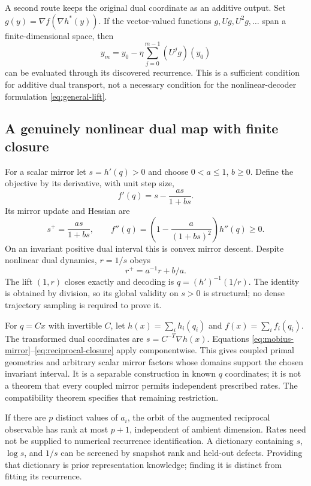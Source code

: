 A second route keeps the original dual coordinate as an additive output.
Set $g(y)=\nabla f(\nabla h^*(y))$. If the vector-valued functions
$g,Ug,U^2g,\ldots$ span a finite-dimensional space, then
\begin{equation}
 y_m=y_0-\eta\sum_{j=0}^{m-1}(U^jg)(y_0)
 \label{eq:gradient-module}
\end{equation}
can be evaluated through its discovered recurrence. This is a sufficient
condition for additive dual transport, not a necessary condition for the
nonlinear-decoder formulation \eqref{eq:general-lift}.

\subsection{A genuinely nonlinear dual map with finite closure}
For a scalar mirror let $s=h'(q)>0$ and choose $0<a\leq1$, $b\geq0$.
Define the objective by its derivative, with unit step size,
\begin{equation}
 f'(q)=s-\frac{as}{1+bs}.
\end{equation}
Its mirror update and Hessian are
\begin{equation}
 s^+=\frac{as}{1+bs},\qquad
 f''(q)=\left(1-\frac{a}{(1+bs)^2}\right)h''(q)\geq0.
 \label{eq:mobius-mirror}
\end{equation}
On an invariant positive dual interval this is convex mirror descent.
Despite nonlinear dual dynamics, $r=1/s$ obeys
\begin{equation}
 r^+=a^{-1}r+b/a.
 \label{eq:reciprocal-closure}
\end{equation}
The lift $(1,r)$ closes exactly and decoding is $q=(h')^{-1}(1/r)$.
The identity is obtained by division, so its global validity on $s>0$ is
structural; no dense trajectory sampling is required to prove it.

For $q=Cx$ with invertible $C$, let
$h(x)=\sum_i h_i(q_i)$ and $f(x)=\sum_i f_i(q_i)$.
The transformed dual coordinates are $s=C^{-T}\nabla h(x)$.
Equations \eqref{eq:mobius-mirror}--\eqref{eq:reciprocal-closure} apply componentwise.
This gives coupled primal geometries and arbitrary scalar mirror factors
whose domains support the chosen invariant interval. It is a separable
construction in known $q$ coordinates; it is not a theorem that every coupled
mirror permits independent prescribed rates. The compatibility theorem
specifies that remaining restriction.

If there are $p$ distinct values of $a_i$, the orbit of the augmented
reciprocal observable has rank at most $p+1$, independent of ambient dimension.
Rates need not be supplied to numerical recurrence identification. A dictionary
containing $s$, $\log s$, and $1/s$ can be screened by snapshot rank and
held-out defects. Providing that dictionary is prior representation knowledge;
finding it is distinct from fitting its recurrence.

